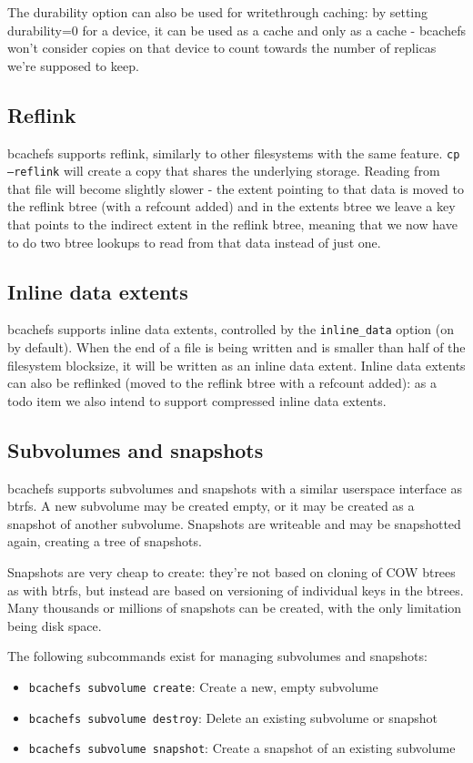 \documentclass{article}
\begin{document}
The durability option can also be used for writethrough caching: by setting
durability=0 for a device, it can be used as a cache and only as a cache -
bcachefs won't consider copies on that device to count towards the number of
replicas we're supposed to keep.

\subsection{Reflink}

bcachefs supports reflink, similarly to other filesystems with the same feature.
\texttt{cp --reflink} will create a copy that shares the underlying storage.
Reading from that file will become slightly slower - the extent pointing to that
data is moved to the reflink btree (with a refcount added) and in the extents
btree we leave a key that points to the indirect extent in the reflink btree,
meaning that we now have to do two btree lookups to read from that data instead
of just one.

\subsection{Inline data extents}

bcachefs supports inline data extents, controlled by the \texttt{inline\_data}
option (on by default). When the end of a file is being written and is smaller
than half of the filesystem blocksize, it will be written as an inline data
extent. Inline data extents can also be reflinked (moved to the reflink btree
with a refcount added): as a todo item we also intend to support compressed
inline data extents.

\subsection{Subvolumes and snapshots}

bcachefs supports subvolumes and snapshots with a similar userspace interface as
btrfs. A new subvolume may be created empty, or it may be created as a snapshot
of another subvolume. Snapshots are writeable and may be snapshotted again,
creating a tree of snapshots.

Snapshots are very cheap to create: they're not based on cloning of COW btrees
as with btrfs, but instead are based on versioning of individual keys in the
btrees. Many thousands or millions of snapshots can be created, with the only
limitation being disk space.

The following subcommands exist for managing subvolumes and snapshots:
\begin{itemize}
	\item \texttt{bcachefs subvolume create}: Create a new, empty subvolume
	\item \texttt{bcachefs subvolume destroy}: Delete an existing subvolume
		or snapshot
	\item \texttt{bcachefs subvolume snapshot}: Create a snapshot of an
		existing subvolume
\end{itemize}
\end{document}
